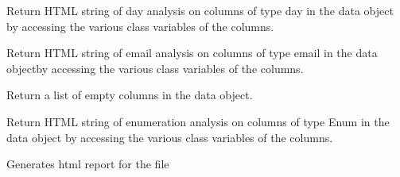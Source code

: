 \documentclass[letterpaper,10pt,english]{sphinxmanual}
\begin{document}
\begin{fulllineitems}

\begin{fulllineitems}
\label{Code_rst/rep:report.Report.day_analysis}
Return HTML string of day analysis on columns of type day 
in the data object by accessing the various class variables of the
columns.

\end{fulllineitems}


\begin{fulllineitems}
\label{Code_rst/rep:report.Report.email_analysis}
Return HTML string of email analysis on columns of type email
in the data objectby accessing the various class variables of the
columns.

\end{fulllineitems}


\begin{fulllineitems}
\label{Code_rst/rep:report.Report.empty_columns}
Return a list of empty columns in the data object.

\end{fulllineitems}


\begin{fulllineitems}
\label{Code_rst/rep:report.Report.enum_analysis}
Return HTML string of enumeration analysis on columns of type Enum 
in the data object by accessing the various class variables of the
columns.

\end{fulllineitems}


\begin{fulllineitems}
\label{Code_rst/rep:report.Report.gen_html}
Generates html report for the file

\end{fulllineitems}



\end{fulllineitems}
\end{document}
